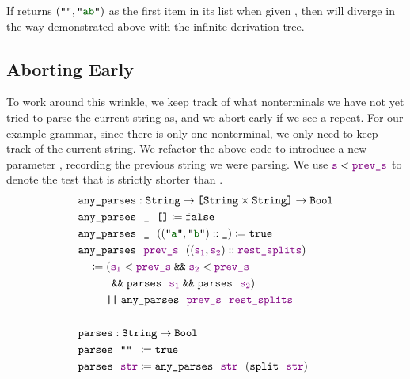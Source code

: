     If  returns $(\str{}, \str{ab})$ as the first item in its list when given , then  will diverge in the way demonstrated above with the infinite derivation tree.

  \subsection{Aborting Early} \label{sec:solve-nontermination}

    To work around this wrinkle, we keep track of what nonterminals we have not yet tried to parse the current string as, and we abort early if we see a repeat.  %
    For our example grammar, since there is only one nonterminal, we only need to keep track of the current string.  We refactor the above code to introduce a new parameter , recording the previous string we were parsing.  We use $\textcolor{violet}{\texttt{s}} < \textcolor{violet}{\texttt{prev\_s}}$ to denote the test that  is strictly shorter than . \label{sec:valid-param-parser}
    \begin{align*}
      & \fname{any\_parses} \oftypesep \String \typeto \typelistp{\typeprod{\String}{\String}} \typeto \Bool \\
      & \fname{any\_parses}~~\termhole~~\nil \defeq \false \\
      & \fname{any\_parses}~~\termhole~~(\cons{(\str{a}, \str{b})}{\termhole}) \defeq \true \\
      & \fname{any\_parses}~~\farg{prev\_s}~~(\cons{(\farg{s$_1$}, \farg{s$_2$})}{\farg{rest\_splits}}) \\
      & \quad \defeq \left( \farg{s$_1$} < \farg{prev\_s} \booland \farg{s$_2$} < \farg{prev\_s} \right. \\
      & \phantom{\quad \defeq \left(\right.} \left.\booland \fname{parses}~~\farg{s$_1$} \booland \fname{parses}~~\farg{s$_2$}\right) \\
      & \phantom{\quad \defeq {}} \boolor \fname{any\_parses}~~\farg{prev\_s}~~\farg{rest\_splits} \\
      \\
      & \fname{parses} \oftypesep \String \typeto \Bool \\
      & \fname{parses}~~\aswidthof{\str{}}{\farg{str}} \defeq \true \\
      & \fname{parses}~~\farg{str} \defeq \fname{any\_parses}~~\farg{str}~~(\fname{split}~~\farg{str})
    \end{align*}

